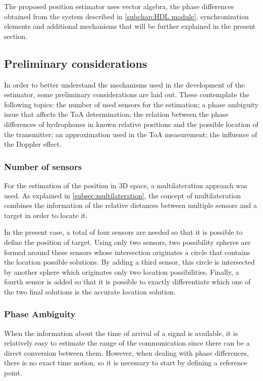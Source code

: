 The proposed position estimator uses vector algebra, the phase differences obtained from the system described in \ref{subchap:HDL module}, synchronization elements and additional mechanisms that will be further explained in the present section.

\subsection{Preliminary considerations}

In order to better understand the mechanisms used in the development of the estimator, some preliminary considerations are laid out. These contemplate the following topics: the number of used sensors for the estimation; a phase ambiguity issue that affects the ToA determination; the relation between the phase differences of hydrophones in known relative positions and the possible location of the transmitter; an approximation used in the ToA measurement; the influence of the Doppler effect.

\subsubsection{Number of sensors}
For the estimation of the position in 3D space, a multilateration approach was used. As explained in \ref{subsec:multilateration}, the concept of multilateration combines the information of the relative distances between multiple sensors and a target in order to locate it. 

In the present case, a total of four sensors are needed so that it is possible to define the position of target. Using only two sensors, two possibility spheres are formed around these sensors whose intersection originates a circle that contains the location possible solutions. By adding a third sensor, this circle is intersected by another sphere which originates only two location possibilities. Finally, a fourth sensor is added so that it is possible to exactly differentiate which one of the two final solutions is the accurate location solution. 

\subsubsection{Phase Ambiguity}

When the information about the time of arrival of a signal is available, it is relatively easy to estimate the range of the communication since there can be a direct conversion between them. However, when dealing with phase differences, there is no exact time notion, so it is necessary to start by defining a reference point. 

